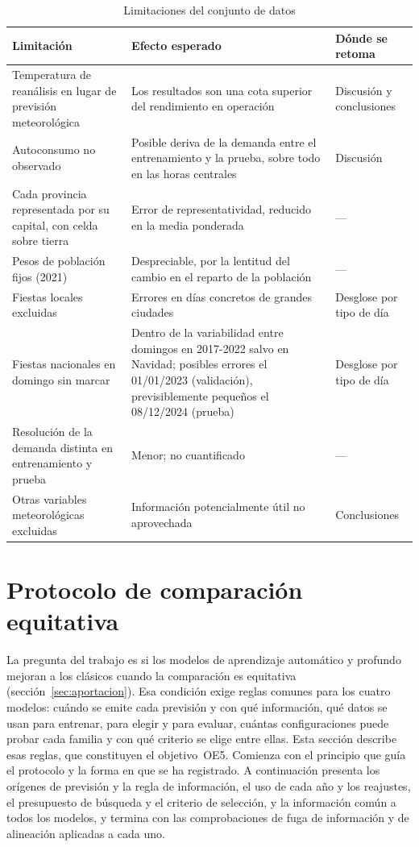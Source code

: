 \begin{table}[htbp]
	\centering
	\caption{Limitaciones del conjunto de datos}
	\label{tab:limitaciones}
	\small
	\begin{tabularx}{\textwidth}{>{\raggedright\arraybackslash}p{4.2cm} >{\raggedright\arraybackslash}X >{\raggedright\arraybackslash}p{3cm}}
		\hline
		\textbf{Limitación} & \textbf{Efecto esperado} & \textbf{Dónde se retoma} \\
		\hline
		Temperatura de reanálisis en lugar de previsión meteorológica & Los resultados son una cota superior del rendimiento en operación & Discusión y conclusiones \\
		Autoconsumo no observado & Posible deriva de la demanda entre el entrenamiento y la prueba, sobre todo en las horas centrales & Discusión \\
		Cada provincia representada por su capital, con celda sobre tierra & Error de representatividad, reducido en la media ponderada & --- \\
		Pesos de población fijos (2021) & Despreciable, por la lentitud del cambio en el reparto de la población & --- \\
		Fiestas locales excluidas & Errores en días concretos de grandes ciudades & Desglose por tipo de día \\
		Fiestas nacionales en domingo sin marcar & Dentro de la variabilidad entre domingos en 2017-2022 salvo en Navidad; posibles errores el 01/01/2023 (validación), previsiblemente pequeños el 08/12/2024 (prueba) & Desglose por tipo de día \\
		Resolución de la demanda distinta en entrenamiento y prueba & Menor; no cuantificado & --- \\
		Otras variables meteorológicas excluidas & Información potencialmente útil no aprovechada & Conclusiones \\
		\hline
	\end{tabularx}
\end{table}
\FloatBarrier

\section{Protocolo de comparación equitativa}\label{sec:protocolo}

La pregunta del trabajo es si los modelos de aprendizaje automático y
profundo mejoran a los clásicos cuando la comparación es equitativa
(sección~\ref{sec:aportacion}). Esa condición exige reglas comunes para los
cuatro modelos: cuándo se emite cada previsión y con qué información, qué
datos se usan para entrenar, para elegir y para evaluar, cuántas
configuraciones puede probar cada familia y con qué criterio se elige entre
ellas. Esta sección describe esas reglas, que constituyen el objetivo~OE5.
Comienza con el principio que guía el protocolo y la forma en que se ha
registrado. A continuación presenta los orígenes de previsión y la regla de
información, el uso de cada año y los reajustes, el presupuesto de búsqueda
y el criterio de selección, y la información común a todos los modelos, y
termina con las comprobaciones de fuga de información y de alineación
aplicadas a cada uno.

